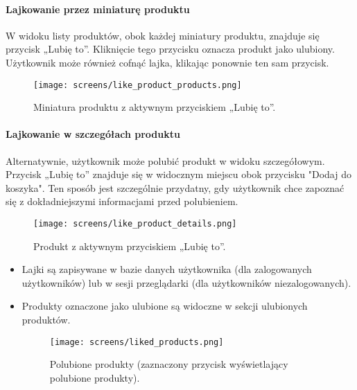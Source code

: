 \documentclass[12pt,a4paper,oneside]{article}
\theoremstyle{definition}
\numberwithin{equation}{section}
\begin{document}
\paragraph{Lajkowanie przez miniaturę produktu}
W widoku listy produktów, obok każdej miniatury produktu, znajduje się przycisk „Lubię to”. Kliknięcie tego przycisku oznacza produkt jako ulubiony. Użytkownik może również cofnąć lajka, klikając ponownie ten sam przycisk.

\begin{figure}[H]
    \centering
    \texttt{[image: screens/like\_product\_products.png]}
    \caption{Miniatura produktu z aktywnym przyciskiem „Lubię to”.}
    \label{fig:like_button_miniature}
\end{figure}

\paragraph{Lajkowanie w szczegółach produktu}
Alternatywnie, użytkownik może polubić produkt w widoku szczegółowym. Przycisk „Lubię to” znajduje się w widocznym miejscu obok przycisku "Dodaj do koszyka". Ten sposób jest szczególnie przydatny, gdy użytkownik chce zapoznać się z dokładniejszymi informacjami przed polubieniem.
\begin{figure}[H]
    \centering
    \texttt{[image: screens/like\_product\_details.png]}
    \caption{Produkt z aktywnym przyciskiem „Lubię to”.}
    \label{fig:like_button_details}
\end{figure}
\begin{itemize}
    \item Lajki są zapisywane w bazie danych użytkownika (dla zalogowanych użytkowników) lub w sesji przeglądarki (dla użytkowników niezalogowanych).
    \item Produkty oznaczone jako ulubione są widoczne w sekcji ulubionych produktów.
    \begin{figure}[H]
        \centering
        \texttt{[image: screens/liked\_products.png]}
        \caption{Polubione produkty (zaznaczony przycisk wyświetlający polubione produkty).}
        \label{fig:liked_products}
    \end{figure}
\end{itemize}







\newpage
\end{document}
